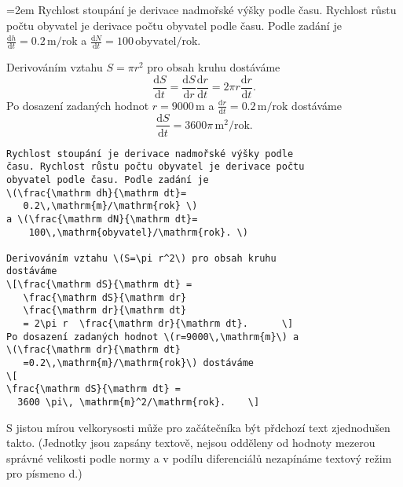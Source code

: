 \documentclass[10pt]{article}
\begin{document}
\begin{multicols}{2}
  \begin{minipage}{1.0\linewidth}
    \parindent=2em
    Rychlost stoupání je derivace nadmořské výšky podle času. 
Rychlost růstu počtu obyvatel je derivace počtu obyvatel podle času.
Podle zadání je \(\frac{\mathrm dh}{\mathrm dt}=0.2\,\mathrm{m}/\mathrm{rok} \)
a \(\frac{\mathrm dN}{\mathrm dt}=100\,\mathrm{obyvatel}/\mathrm{rok}. \)

Derivováním vztahu \(S=\pi r^2\) pro obsah kruhu dostáváme
\[\frac{\mathrm dS}{\mathrm dt}= \frac{\mathrm dS}{\mathrm dr} \frac{\mathrm dr}{\mathrm dt}=2\pi r  \frac{\mathrm dr}{\mathrm dt}.\] Po dosazení zadaných hodnot \(r=9000\,\mathrm{m}\) a \(\frac{\mathrm dr}{\mathrm dt}=0.2\,\mathrm{m}/\mathrm{rok}\) dostáváme
\[\frac{\mathrm dS}{\mathrm dt} =3600 \pi\, \mathrm{m}^2/\mathrm{rok}.\]

  \end{minipage}

\columnbreak
  
\begin{lstlisting}
Rychlost stoupání je derivace nadmořské výšky podle 
času. Rychlost růstu počtu obyvatel je derivace počtu 
obyvatel podle času. Podle zadání je 
\(\frac{\mathrm dh}{\mathrm dt}=
   0.2\,\mathrm{m}/\mathrm{rok} \)
a \(\frac{\mathrm dN}{\mathrm dt}=
    100\,\mathrm{obyvatel}/\mathrm{rok}. \)

Derivováním vztahu \(S=\pi r^2\) pro obsah kruhu 
dostáváme
\[\frac{\mathrm dS}{\mathrm dt} = 
   \frac{\mathrm dS}{\mathrm dr} 
   \frac{\mathrm dr}{\mathrm dt} 
   = 2\pi r  \frac{\mathrm dr}{\mathrm dt}.      \] 
Po dosazení zadaných hodnot \(r=9000\,\mathrm{m}\) a 
\(\frac{\mathrm dr}{\mathrm dt}
   =0.2\,\mathrm{m}/\mathrm{rok}\) dostáváme
\[
\frac{\mathrm dS}{\mathrm dt} =
  3600 \pi\, \mathrm{m}^2/\mathrm{rok}.    \]
\end{lstlisting}

\end{multicols}


S jistou mírou velkorysosti může pro začátečníka být přdchozí text zjednodušen takto.
(Jednotky jsou zapsány textově, nejsou odděleny od hodnoty mezerou správné velikosti podle normy a v podílu diferenciálů nezapínáme textový
režim pro písmeno d.)
\end{document}
